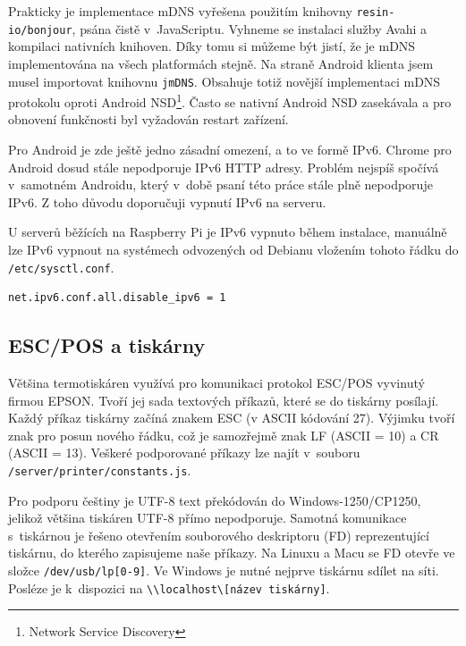 \documentclass[a4paper,11pt,oneside]{article}
\begin{document}
Prakticky je implementace mDNS vyřešena použitím knihovny \lstinline|resin-io/bonjour|, psána čistě v~JavaScriptu. Vyhneme se instalaci služby Avahi a kompilaci nativních knihoven. Díky tomu si můžeme být jistí, že je mDNS implementována na všech platformách stejně. 
Na straně Android klienta jsem musel importovat knihovnu \lstinline|jmDNS|. Obsahuje totiž novější implementaci mDNS protokolu oproti Android NSD\footnote{Network Service Discovery}. Často se nativní Android NSD zasekávala a pro obnovení funkčnosti byl vyžadován restart zařízení. 

Pro Android je zde ještě jedno zásadní omezení, a to ve formě IPv6. Chrome pro Android dosud stále nepodporuje IPv6 HTTP adresy. Problém nejspíš spočívá v~samotném Androidu, který v~době psaní této práce stále plně nepodporuje IPv6\cite{ipv6bug}. Z toho důvodu doporučuji vypnutí IPv6 na serveru.

U serverů běžících na Raspberry Pi je IPv6 vypnuto během instalace, manuálně lze IPv6 vypnout na systémech odvozených od Debianu vložením tohoto řádku do \lstinline|/etc/sysctl.conf|.

\begin{lstlisting}[language=bash, caption={sysctl.conf}]
net.ipv6.conf.all.disable_ipv6 = 1
\end{lstlisting}

\subsection{ESC/POS a tiskárny}

Většina termotiskáren využívá pro komunikaci protokol ESC/POS vyvinutý firmou EPSON. Tvoří jej sada textových příkazů, které se do tiskárny posílají. Každý příkaz tiskárny začíná znakem ESC (v ASCII kódování 27). Výjimku tvoří znak pro posun nového řádku, což je samozřejmě znak LF (ASCII = 10) a CR (ASCII = 13). Veškeré podporované příkazy lze najít v~souboru \lstinline|/server/printer/constants.js|. 

\pagebreak

Pro podporu češtiny je UTF-8 text překódován do Windows-1250/CP1250, jelikož většina tiskáren UTF-8 přímo nepodporuje. Samotná komunikace s~tiskárnou je řešeno otevřením souborového deskriptoru (FD) reprezentující tiskárnu, do kterého zapisujeme naše příkazy. Na Linuxu a Macu se FD otevře ve složce \lstinline|/dev/usb/lp[0-9]|. Ve Windows je nutné nejprve tiskárnu sdílet na síti. Posléze je k~dispozici na \lstinline|\\localhost\[název tiskárny]|.
\end{document}
